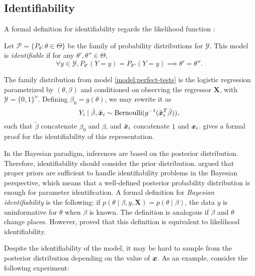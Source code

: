 \subsection{Identifiability}
\label{sec:perfect-test-identifiability}

A formal definition for identifiability regards the likelihood function \cite[p.
3459]{xie2006measures}:

\begin{definition}
  \label{def:identifiability}
  Let $\mathcal{P} = \{P_{\theta} : \theta \in \Theta\}$ be
  the family of probability distributions for $\mathcal{Y}$. This model is
  {\em identifiable} if for any $\theta', \theta'' \in
  \Theta$, 
  $$\forall y \in \mathcal{Y}, P_{\theta'}(Y = y) =
  P_{\theta''}(Y = y) \implies
  \theta' = \theta''.$$ 
\end{definition} 

The family distribution from model \eqref{model:perfect-tests} is the logistic
regression parametrized by $(\theta, \beta)$ and conditioned on
observing the regressor $\boldsymbol{X}$, with $\mathcal{Y} = \{0,1\}^n$. Defining $\beta_0 =
g(\theta)$, we may rewrite it as 
$$Y_i \mid \tilde{\beta}, \tilde{\boldsymbol{x}}_i \sim \operatorname{Bernoulli}(g^{-1}(\tilde{\boldsymbol{x}}_i^T\tilde{\beta})),$$
such that $\tilde{\beta}$ concatenate $\beta_0$ and $\beta$, and $\tilde{\boldsymbol{x}}_i$
concatenate $1$ and $\boldsymbol{x}_i$. \textcite[p. 7]{kuchenhoff1995identification}
gives a formal proof for the identifiability of this representation.

In the Bayesian paradigm, inferences are based on the posterior distribution.
Therefore, identifiability should consider the prior distribution.
\textcite[p. 46]{lindley1972bayesian}  argued that proper priors are
sufficient to handle
identifiability problems in the Bayesian perspective, which means that a
well-defined posterior probability distribution is enough for parameter
identification. A formal definition for {\em Bayesian identifiability} is the
following: if $p(\theta \mid \beta, y, \boldsymbol{X}) = p(\theta \mid
\beta)$, the data $y$ is uninformative for $\theta$ when $\beta$ is known. 
The definition is analogous if $\beta$ and $\theta$ change places. However,
\textcite[p. 248]{gelfand1999identifiability} proved that this definition is equivalent to
likelihood identifiability. 

Despite the identifiability of the model, it may be hard to sample from
the posterior distribution depending on the value of $\boldsymbol{x}$. As an example, 
consider the following experiment: 

